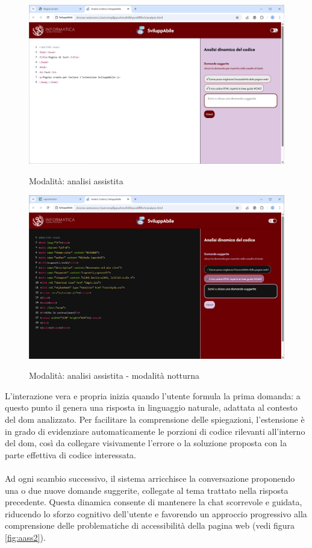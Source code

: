 \begin{figure}[H]
    \centering
    \includegraphics[width=1\linewidth, alt={Modalità di analisi assistita}]{img/analisi_ass.png}
    \caption{Modalità: analisi assistita}\label{fig:aass}
\end{figure}

\begin{figure}[H]
    \centering
    \includegraphics[width=1\linewidth, alt={Modalità di analisi assistita - modalità notturna}]{img/analisi_ass_dark.png}
    \caption{Modalità: analisi assistita - modalità notturna}\label{fig:aass_notte}
\end{figure}

\noindent L’interazione vera e propria inizia quando l’utente formula la prima domanda: a questo punto il  genera una risposta in linguaggio naturale, adattata al contesto del \acrshort{dom} analizzato. Per facilitare la comprensione delle spiegazioni, l’estensione è in grado di evidenziare automaticamente le porzioni di codice rilevanti all’interno del \acrshort{dom}, così da collegare visivamente l’errore o la soluzione proposta con la parte effettiva di codice interessata.\\
\\
Ad ogni scambio successivo, il sistema arricchisce la conversazione proponendo una o due nuove domande suggerite, collegate al tema trattato nella risposta precedente. Questa dinamica consente di mantenere la chat scorrevole e guidata, riducendo lo sforzo cognitivo dell’utente e favorendo un approccio progressivo alla comprensione delle problematiche di accessibilità della pagina web (vedi figura \ref{fig:aass2}).


